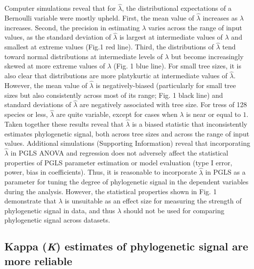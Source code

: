 \documentclass[
]{article}
\begin{document}
Computer simulations reveal that for \(\hat{\lambda}\), the
distributional expectations of a Bernoulli variable were mostly upheld.
First, the mean value of \(\hat{\lambda}\) increases as \(\lambda\)
increases. Second, the precision in estimating \(\lambda\) varies across
the range of input values, as the standard deviation of
\(\hat{\lambda}\) is largest at intermediate values of \(\lambda\) and
smallest at extreme values (Fig.1 red line). Third, the distributions of
\(\hat{\lambda}\) tend toward normal distributions at intermediate
levels of \(\lambda\) but become increasingly skewed at more extreme
values of \(\lambda\) (Fig. 1 blue line). For small tree sizes, it is
also clear that distributions are more platykurtic at intermediate
values of \(\hat{\lambda}\). However, the mean value of
\(\hat{\lambda}\) is negatively-biased (particularly for small tree
sizes but also consistently across most of its range; Fig. 1 black line)
and standard deviations of \(\hat{\lambda}\) are negatively associated
with tree size. For tress of 128 species or less, \(\hat{\lambda}\) are
quite variable, except for cases when \(\lambda\) is near or equal to
\(1\). Taken together these results reveal that \(\hat\lambda\) is a
biased statistic that inconsistently estimates phylogenetic signal, both
across tree sizes and across the range of input values. Additional
simulations (Supporting Information) reveal that incorporating
\(\hat\lambda\) in PGLS ANOVA and regression does not adversely affect
the statistical properties of PGLS parameter estimation or model
evaluation (type I error, power, bias in coefficients). Thus, it is
reasonable to incorporate \(\hat\lambda\) in PGLS as a parameter for
tuning the degree of phylogenetic signal in the dependent variables
during the analysis. However, the statistical properties shown in Fig. 1
demonstrate that \(\lambda\) is unsuitable as an effect size for
measuring the strength of phylogenetic signal in data, and thus
\(\lambda\) should not be used for comparing phylogenetic signal across
datasets.

\hypertarget{kappa-k-estimates-of-phylogenetic-signal-are-more-reliable}{%
\subsection{\texorpdfstring{Kappa (\emph{K}) estimates of phylogenetic
signal are more
reliable}{Kappa (K) estimates of phylogenetic signal are more reliable}}\label{kappa-k-estimates-of-phylogenetic-signal-are-more-reliable}}
\end{document}
